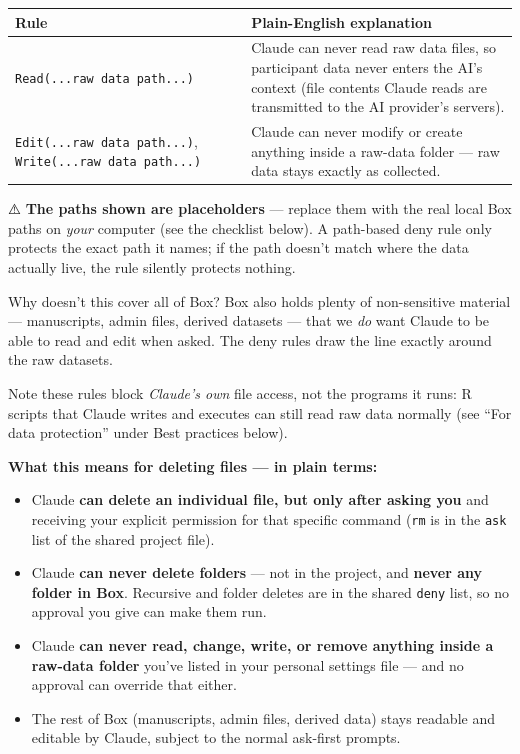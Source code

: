 \documentclass[
]{book}
\newcounter{none} %
\providecommand{\tightlist}{%
  \setlength{\itemsep}{0pt}\setlength{\parskip}{0pt}}
\begin{document}
{\def\LTcaptype{none} %
\begin{longtable}[]{@{}
  >{\raggedright\arraybackslash}p{}
  >{\raggedright\arraybackslash}p{}@{}}
\toprule\noalign{}
\begin{minipage}[b]{\linewidth}\raggedright
Rule
\end{minipage} & \begin{minipage}[b]{\linewidth}\raggedright
Plain-English explanation
\end{minipage} \\
\midrule\noalign{}
\endhead
\bottomrule\noalign{}
\endlastfoot
\texttt{Read(...raw\ data\ path...)} & Claude can never read raw data files, so participant data never enters the AI's context (file contents Claude reads are transmitted to the AI provider's servers). \\
\texttt{Edit(...raw\ data\ path...)}, \texttt{Write(...raw\ data\ path...)} & Claude can never modify or create anything inside a raw-data folder --- raw data stays exactly as collected. \\
\end{longtable}
}

⚠️ \textbf{The paths shown are placeholders} --- replace them with the real
local Box paths on \emph{your} computer (see the checklist below). A
path-based deny rule only protects the exact path it names; if the path
doesn't match where the data actually live, the rule silently protects
nothing.

Why doesn't this cover all of Box? Box also holds plenty of
non-sensitive material --- manuscripts, admin files, derived datasets ---
that we \emph{do} want Claude to be able to read and edit when asked. The
deny rules draw the line exactly around the raw datasets.

Note these rules block \emph{Claude's own} file access, not the programs it
runs: R scripts that Claude writes and executes can still read raw
data normally (see ``For data protection'' under Best practices below).

\textbf{What this means for deleting files --- in plain terms:}

\begin{itemize}
\tightlist
\item
  Claude \textbf{can delete an individual file, but only after asking you} and receiving your explicit permission for that specific command (\texttt{rm} is in the \texttt{ask} list of the shared project file).
\item
  Claude \textbf{can never delete folders} --- not in the project, and \textbf{never any folder in Box}. Recursive and folder deletes are in the shared \texttt{deny} list, so no approval you give can make them run.
\item
  Claude \textbf{can never read, change, write, or remove anything inside a raw-data folder} you've listed in your personal settings file --- and no approval can override that either.
\item
  The rest of Box (manuscripts, admin files, derived data) stays readable and editable by Claude, subject to the normal ask-first prompts.
\end{itemize}
\end{document}

